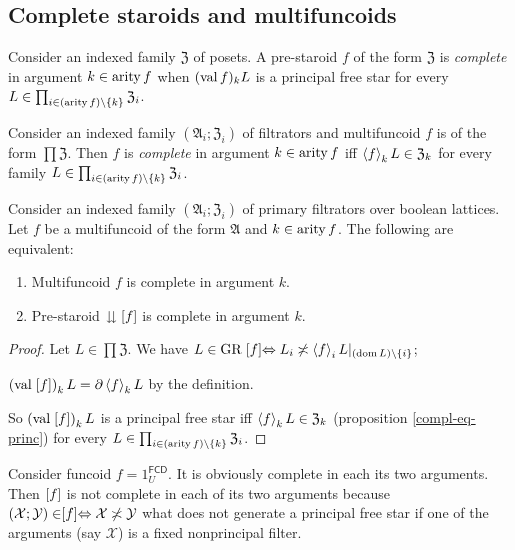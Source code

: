 \subsection{Complete staroids and multifuncoids}
\begin{defn}
Consider an indexed family $\mathfrak{Z}$
of posets. A pre-staroid $f$ of the form $\mathfrak{Z}$ is \emph{complete}
in argument $k\in\operatorname{arity} f$ when $(\operatorname{val} f)_{k}L$ is a principal free
star for every $L\in\prod_{i\in(\operatorname{arity} f)\setminus\{k\}}\mathfrak{Z}_{i}$.
\end{defn}

\begin{defn}
Consider an indexed family $(\mathfrak{A}_{i};\mathfrak{Z}_{i})$
of filtrators and multifuncoid $f$ is of the form $\prod\mathfrak{Z}$.
Then $f$ is \emph{complete} in argument $k\in\operatorname{arity} f$ iff $\left\langle f\right\rangle_{k}L\in\mathfrak{Z}_{k}$
for every family $L\in\prod_{i\in(\operatorname{arity} f)\setminus\{k\}}\mathfrak{Z}_{i}$.\end{defn}
\begin{prop}
Consider an indexed family $(\mathfrak{A}_{i};\mathfrak{Z}_{i})$
of primary filtrators over boolean lattices. Let $f$ be a multifuncoid
of the form $\mathfrak{A}$ and $k\in\operatorname{arity} f$. The following are
equivalent:
\begin{enumerate}
\item Multifuncoid $f$ is complete in argument $k$.
\item Pre-staroid $\downdownarrows\mathord{\mathrel{\left[f\right]}}$ is complete in argument
$k$.
\end{enumerate}
\end{prop}
\begin{proof}
Let $L\in\prod\mathfrak{Z}$. We have $L\in\operatorname{GR}\mathrel{\left[f\right]}\Leftrightarrow L_{i}\not\asymp\left\langle f\right\rangle_{i}L|_{(\operatorname{dom} L)\setminus\{i\}}$;

$\left(\operatorname{val}\mathrel{\left[f\right]}\right)_{k}L=\partial\left\langle f\right\rangle_{k}L$ by the
definition.

So $\left(\operatorname{val}\mathrel{\left[f\right]}\right)_{k}L$ is a principal free star iff
$\left\langle f\right\rangle_{k}L\in\mathfrak{Z}_{k}$ (proposition \ref{compl-eq-princ})
for every $L\in\prod_{i\in(\operatorname{arity} f)\setminus\{k\}}\mathfrak{Z}_{i}$.\end{proof}
\begin{example}
Consider funcoid $f=1_{U}^{\mathsf{FCD}}$. It is obviously complete
in each its two arguments. Then $\mathrel{\left[f\right]}$ is not complete in each
of its two arguments because $(\mathcal{X};\mathcal{Y})\in\mathrel{\left[f\right]}\Leftrightarrow\mathcal{X}\not\asymp\mathcal{Y}$
what does not generate a principal free star if one of the arguments
(say $\mathcal{X}$) is a fixed nonprincipal filter.\end{example}
